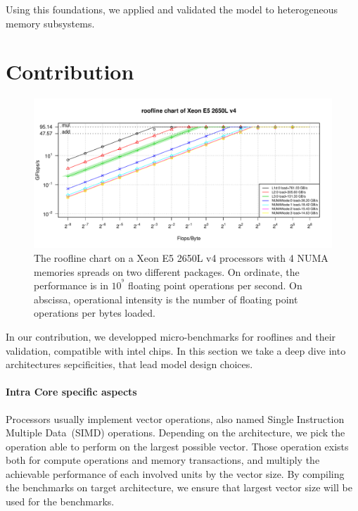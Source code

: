 \documentclass[twoside,twocolumn,8pt]{extarticle}
\begin{document}
Using this foundations, we applied and validated the model to heterogeneous memory subsystems.

\section{Contribution}\label{sec:contrib}
\begin{figure}
  \centering
  \includegraphics[width=\textwidth]{pictures/roofline_model}
  \caption{The roofline chart on a Xeon E5 2650L v4 processors with 4 NUMA memories spreads on two different packages. On ordinate, the performance is in $10^{^9}$ floating point operations per second. On abscissa, operational intensity is the number of floating point operations per bytes loaded.}
  \label{fig:orig_model}
\end{figure}

In our contribution, we developped micro-benchmarks for rooflines and their validation, compatible with intel chips.
In this section we take a deep dive into architectures sepcificities, that lead model design choices.

\paragraph{Intra Core specific aspects}
Processors usually implement vector operations, also named Single Instruction Multiple Data~(SIMD) operations.
Depending on the architecture, we pick the operation able to perform on the largest possible vector. Those operation exists
both for compute operations and memory transactions, and multiply the achievable performance of each involved units by the vector
size. By compiling the benchmarks on target architecture, we ensure that largest vector size will be used for the benchmarks.
\end{document}
